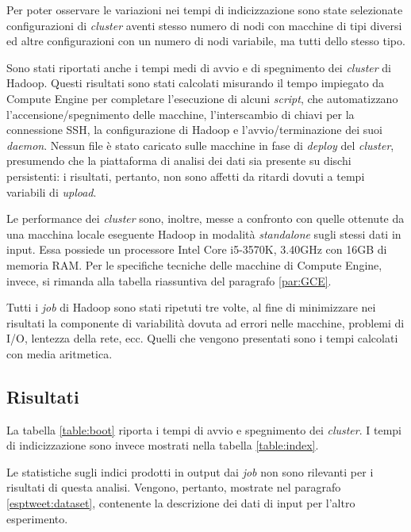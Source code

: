Per poter osservare le variazioni nei tempi di indicizzazione sono state selezionate configurazioni di \textit{cluster} aventi stesso numero di nodi con macchine di tipi diversi ed altre configurazioni con un numero di nodi 
variabile, ma tutti dello stesso tipo. 

Sono stati riportati anche i tempi medi di avvio e di spegnimento dei \textit{cluster} di Hadoop. Questi risultati sono stati calcolati misurando il tempo impiegato da Compute Engine 
per completare l'esecuzione di alcuni \textit{script}, che automatizzano l'accensione/spegnimento delle macchine, l'interscambio di chiavi per la connessione SSH, 
la configurazione di Hadoop e l'avvio/terminazione dei suoi \textit{daemon}. Nessun file è stato caricato sulle macchine in fase di \textit{deploy} del \textit{cluster}, presumendo 
che la piattaforma di analisi dei dati sia presente su dischi persistenti: i risultati, pertanto, non sono affetti da ritardi dovuti a tempi variabili di \textit{upload}.

Le performance dei \textit{cluster} sono, inoltre, messe a confronto con quelle ottenute da una macchina locale eseguente Hadoop in modalità \textit{standalone} sugli stessi dati in input.
Essa possiede un processore Intel Core i5-3570K, 3.40GHz con 16GB di memoria RAM. Per le specifiche tecniche delle macchine di Compute Engine, invece, si rimanda alla tabella riassuntiva
del paragrafo \ref{par:GCE}.

Tutti i \textit{job} di Hadoop sono stati ripetuti tre volte, al fine di minimizzare nei risultati la componente di variabilità dovuta ad errori nelle macchine, problemi di I/O, 
lentezza della rete, ecc. Quelli che vengono presentati sono i tempi calcolati con media aritmetica.


\subsection{Risultati}

La tabella \ref{table:boot} riporta i tempi di avvio e spegnimento dei \textit{cluster}. I tempi di indicizzazione sono invece mostrati nella tabella \ref{table:index}.

Le statistiche sugli indici prodotti in output dai \textit{job} non sono rilevanti per i risultati di questa analisi.
Vengono, pertanto, mostrate nel paragrafo \ref{esptweet:dataset}, contenente la descrizione dei dati di input per l'altro esperimento.

